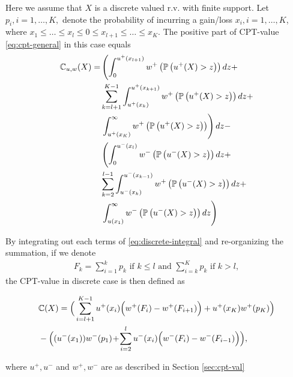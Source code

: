 Here we assume that $X$ is a discrete valued r.v. with finite support. 
Let $p_i, i=1,\ldots,K,$ denote the probability of incurring a gain/loss $x_i, i=1,\ldots,K$, where 
$x_1\le \ldots \le x_l \le 0 \le x_{l+1} \le \ldots \le x_K$.
The positive part of CPT-value \eqref{eq:cpt-general} in this case equals
\begin{align}
\label{eq:discrete-integral}
\mathbb{C}_{u,w}(X)  = &\left( \int_0^{u^+(x_{l+1})} w^+\left(\mathbb{P}\left( u^+(X)>z \right)\right) dz + \right. \nonumber \\
&\sum_{k=l+1}^{K-1}\int_{u^+(x_{k})}^{u^+(x_{k+1})} w^+\left(\mathbb{P}\left( u^+(X)>z \right)\right) dz + \nonumber\\
&\left.\int_{u^+(x_{K})}^\infty w^+\left(\mathbb{P}\left( u^+(X)>z \right)\right) \right) dz - \nonumber\\
&\left( \int_0^{u^-(x_l)} w^-\left(\mathbb{P}\left( u^-(X)>z \right)\right) dz + \right.\nonumber\\
&\sum_{k =2}^{l-1} \int_{u^-(x_{k})}^{u^-(x_{k-1})}w^+\left(\mathbb{P}\left( u^-(X)>z \right)\right) dz + \nonumber\\
&\left.\int_{u(x_1)}^\infty w^-\left(\mathbb{P}\left( u^-(X)>z \right)\right) dz \right)
\end{align}

By integrating out each terms of \eqref{eq:discrete-integral} and re-organizing the summation, if we denote 
\begin{align}
\label{eq:Fk}
 F_k = 
   \sum_{i=1}^k p_k  \text{ if   } k \leq l \text{ and }
   \sum_{i=k}^K p_k  \text{ if  }  k > l,
\end{align}
the CPT-value in discrete case is then defined as  
\begin{small}
\begin{align*}
&\mathbb{C}(X)= \Big(\sum_{i=l+1}^{K-1} u^+(x_i) \Big(w^+(F_i) - w^+(F_{i+1})\Big)
 + u^+(x_K) w^+(p_K)\Big)\\
& -\Big((u^-(x_1)) w^-(p_1) 
\!+\!\sum_{i=2}^l u^-(x_i) \Big(w^-(F_i) - w^-(F_{i-1})\Big)\Big),
\end{align*} 
\end{small}
where $u^+, u^-$ and $w^+, w^-$ are as described in Section \ref{sec:cpt-val}

